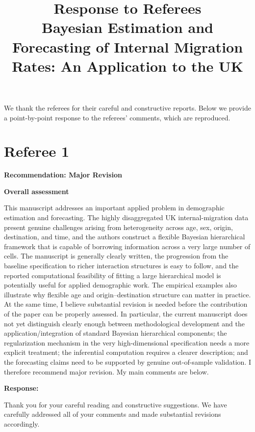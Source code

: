 \documentclass[11pt,a4paper]{article}
\title{Response to Referees\\[0.5em]\large Bayesian Estimation and Forecasting of Internal Migration Rates: An Application to the UK}
\author{}
\date{}
\newlength{\replyspace}
\newenvironment{response}{\par\addvspace{\replyspace}\nopagebreak\textbf{\textcolor{replyblue}{Response:}}\par\begingroup\color{replyblue}}{\par\endgroup\vspace{\replyspace}}
\begin{document}
\maketitle
\vspace{-2em}
We thank the referees for their careful and constructive reports. Below we provide a point-by-point response to the referees' comments, which are reproduced.

\section*{Referee 1}
\textbf{Recommendation: Major Revision}

\textbf{Overall assessment}

This manuscript addresses an important applied problem in demographic estimation and forecasting. The highly disaggregated UK internal-migration data present genuine challenges arising from heterogeneity across age, sex, origin, destination, and time, and the authors construct a flexible Bayesian hierarchical framework that is capable of borrowing information across a very large number of cells. The manuscript is generally clearly written, the progression from the baseline specification to richer interaction structures is easy to follow, and the reported computational feasibility of fitting a large hierarchical model is potentially useful for applied demographic work. The empirical examples also illustrate why flexible age and origin--destination structure can matter in practice. At the same time, I believe substantial revision is needed before the contribution of the paper can be properly assessed. In particular, the current manuscript does not yet distinguish clearly enough between methodological development and the application/integration of standard Bayesian hierarchical components; the regularization mechanism in the very high-dimensional specification needs a more explicit treatment; the inferential computation requires a clearer description; and the forecasting claims need to be supported by genuine out-of-sample validation. I therefore recommend major revision. My main comments are below.
\begin{response}
Thank you for your careful reading and constructive suggestions. We have carefully addressed all of your comments and made substantial revisions accordingly.
\end{response}
\end{document}
